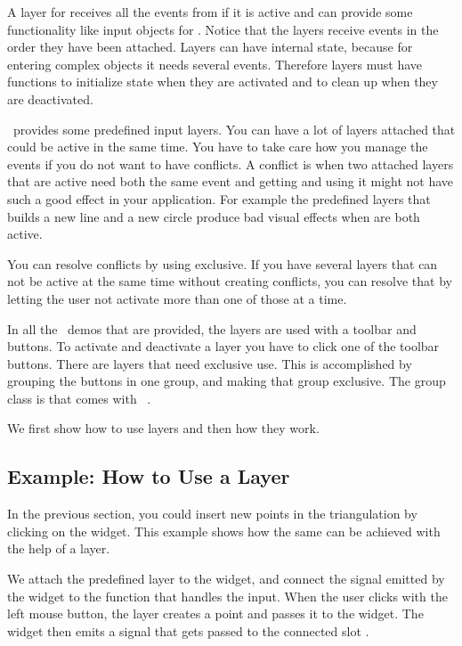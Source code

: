 A layer for  receives all the events from
 if it is active and can provide some functionality
like input objects for . Notice that the layers
receive events in the order they have been attached. Layers can have
internal state, because for entering complex objects it needs several
events. Therefore layers must have functions to initialize state when
they are activated and to clean up when they are deactivated.

\cgal\ provides some predefined input layers. You can have a lot of
layers attached that could be active in the same time. You have to
take care how you manage the events if you do not want to have
conflicts. A conflict is when two attached layers that are active need 
both the same event and getting and using it might not have such a
good effect in your application. For example the predefined layers that 
builds a new line and a new circle produce bad visual effects when are 
both active.

You can resolve conflicts by using  exclusive. If you have 
several layers that can not be active at the same time without creating
conflicts, you can resolve that by letting the user not activate
more than one of those at a time.

\begin{ccAdvanced}
In all the \cgal\ demos that are provided, the layers are used with a
toolbar and buttons. To activate and deactivate a layer you have to
click one of the toolbar buttons. There are layers that need exclusive 
use. This is accomplished by grouping the buttons in one group, and
making that group exclusive. The group class is  that
comes with \cgalqt\ .
\end{ccAdvanced}

We first show how to use layers and then how they work.

\subsection{Example: How to Use a Layer}

In the previous section, you could insert new points in the
triangulation by clicking on the widget. This example shows how
the same can be achieved with the help of a layer.

We attach the predefined layer  to the widget,
and connect the signal emitted by the widget to the function that
handles the input.  When the user clicks with the left mouse button,
the layer creates a point and passes it to the widget. The widget then
emits a signal that gets passed to the connected slot
.

